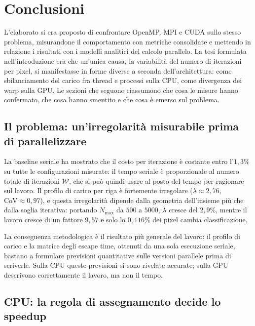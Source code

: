 \section{Conclusioni}
\label{sec:conclusioni}

L'elaborato si era proposto di confrontare OpenMP, MPI e CUDA sullo stesso
problema, misurandone il comportamento con metriche consolidate e mettendo in
relazione i risultati con i modelli analitici del calcolo parallelo. La tesi
formulata nell'introduzione era che un'unica causa, la variabilità del numero di
iterazioni per pixel, si manifestasse in forme diverse a seconda
dell'architettura: come sbilanciamento del carico fra thread e processi sulla
CPU, come divergenza dei warp sulla GPU. Le sezioni che seguono riassumono che
cosa le misure hanno confermato, che cosa hanno smentito e che cosa è emerso
sul problema.

\subsection{Il problema: un'irregolarità misurabile prima di parallelizzare}

La baseline seriale ha mostrato che il costo per iterazione è costante entro
l'$1{,}3\%$ su tutte le configurazioni misurate: il tempo seriale è proporzionale
al numero totale di iterazioni $\mathcal{W}$, che si può quindi usare al posto del
tempo per ragionare sul lavoro. Il profilo di carico per riga è fortemente
irregolare ($\lambda \approx 2{,}76$, $\mathrm{CoV} \approx 0{,}97$), e questa
irregolarità dipende dalla geometria dell'insieme più che dalla soglia iterativa:
portando $N_{\max}$ da $500$ a $5000$, $\lambda$ cresce del $2{,}9\%$, mentre il
lavoro cresce di un fattore $9{,}57$ e solo lo $0{,}116\%$ dei pixel cambia
classificazione.

La conseguenza metodologica è il risultato più generale del lavoro: il profilo
di carico e la matrice degli escape time, ottenuti da una sola esecuzione
seriale, bastano a formulare previsioni quantitative sulle versioni parallele
prima di scriverle. Sulla CPU queste previsioni si sono rivelate accurate; sulla
GPU descrivono correttamente il lavoro, ma non il tempo.

\subsection{CPU: la regola di assegnamento decide lo speedup}

